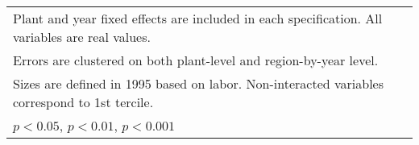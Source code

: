 \begin{table}[htbp]
\begin{tabular}{l*{6}{c}}
\multicolumn{7}{l}{\footnotesize Plant and year fixed effects are included in each specification. All variables are real values.}\\
\multicolumn{7}{l}{\footnotesize Errors are clustered on both plant-level and region-by-year level.}\\
\multicolumn{7}{l}{\footnotesize Sizes are defined in 1995 based on labor. Non-interacted variables correspond to 1st tercile.}\\
\multicolumn{7}{l}{\footnotesize \sym{*} \(p<0.05\), \sym{**} \(p<0.01\), \sym{***} \(p<0.001\)}\\
\end{tabular}
\end{table}
